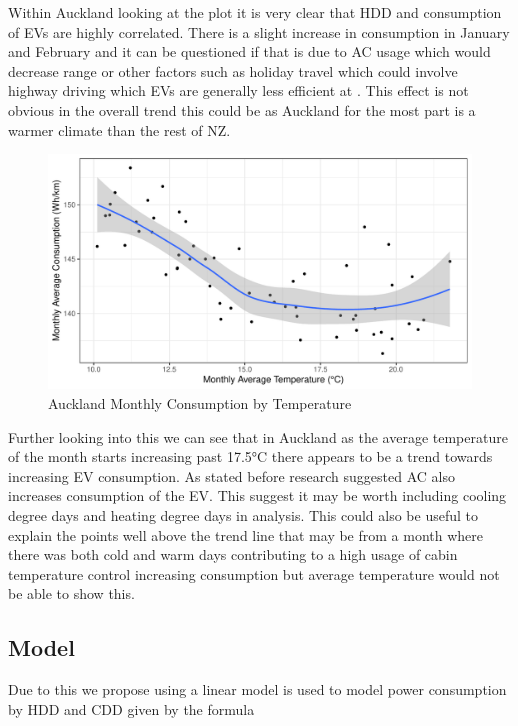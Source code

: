 \documentclass[
]{article}
\begin{document}
Within Auckland looking at the plot it is very clear that HDD and
consumption of EVs are highly correlated. There is a slight increase in
consumption in January and February and it can be questioned if that is
due to AC usage which would decrease range \cite{ev_range} or other
factors such as holiday travel which could involve highway driving which
EVs are generally less efficient at \cite{ev_highway}. This effect is
not obvious in the overall trend this could be as Auckland for the most
part is a warmer climate than the rest of NZ.

\begin{figure}
\centering
\includegraphics{summary_week4_files/figure-latex/temp_eff_plot-1.pdf}
\caption{Auckland Monthly Consumption by Temperature}
\end{figure}

Further looking into this we can see that in Auckland as the average
temperature of the month starts increasing past 17.5°C there appears to
be a trend towards increasing EV consumption. As stated before research
\cite{ev_range} suggested AC also increases consumption of the EV. This
suggest it may be worth including cooling degree days and heating degree
days in analysis. This could also be useful to explain the points well
above the trend line that may be from a month where there was both cold
and warm days contributing to a high usage of cabin temperature control
increasing consumption but average temperature would not be able to show
this.

\hypertarget{model}{%
\subsection{Model}\label{model}}

Due to this we propose using a linear model is used to model power
consumption by HDD and CDD given by the formula
\end{document}
